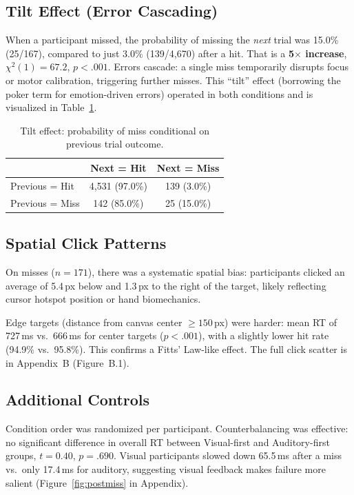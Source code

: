 \documentclass[12pt,letterpaper]{article}
\begin{document}
\subsection{Tilt Effect (Error Cascading)}

When a participant missed, the probability of missing the \emph{next} trial was 15.0\% (25/167), compared to just 3.0\% (139/4{,}670) after a hit. That is a \textbf{5$\times$ increase}, $\chi^2(1) = 67.2$, $p < .001$. Errors cascade: a single miss temporarily disrupts focus or motor calibration, triggering further misses. This ``tilt'' effect (borrowing the poker term for emotion-driven errors) operated in both conditions and is visualized in Table~\ref{tab:tilt}.

\begin{table}[H]
\centering
\caption{Tilt effect: probability of miss conditional on previous trial outcome.}
\label{tab:tilt}
\begin{tabular}{lcc}
\toprule
& \textbf{Next = Hit} & \textbf{Next = Miss} \\
\midrule
Previous = Hit & 4{,}531 (97.0\%) & 139 (3.0\%) \\
Previous = Miss & 142 (85.0\%) & 25 (15.0\%) \\
\bottomrule
\end{tabular}
\end{table}

\subsection{Spatial Click Patterns}

On misses ($n = 171$), there was a systematic spatial bias: participants clicked an average of 5.4\,px below and 1.3\,px to the right of the target, likely reflecting cursor hotspot position or hand biomechanics.

Edge targets (distance from canvas center $\geq 150$\,px) were harder: mean RT of 727\,ms vs.\ 666\,ms for center targets ($p < .001$), with a slightly lower hit rate (94.9\% vs.\ 95.8\%). This confirms a Fitts' Law-like effect. The full click scatter is in Appendix~B (Figure~B.1).

\subsection{Additional Controls}

Condition order was randomized per participant. Counterbalancing was effective: no significant difference in overall RT between Visual-first and Auditory-first groups, $t = 0.40$, $p = .690$. Visual participants slowed down 65.5\,ms after a miss vs.\ only 17.4\,ms for auditory, suggesting visual feedback makes failure more salient (Figure~\ref{fig:postmiss} in Appendix).
\end{document}
